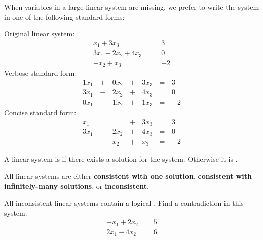 \begin{applicationActivities}
\begin{remark}
  When variables in a large linear system are missing, we prefer to
  write the system in one of the following standard forms:

  \begin{multicols}{3}\noindent
    Original linear system:
    \begin{alignat*}{2}
       x_1 + 3x_3 &\,=\,& 3 \\
      3x_1 - 2x_2 + 4x_3 &\,=\,& 0 \\
      -x_2 +  x_3 &\,=\,& -2
    \end{alignat*}
    Verbose standard form:
    \begin{alignat*}{4}
      1x_1 &\,+\,& 0x_2 &\,+\,& 3x_3 &\,=\,& 3 \\
      3x_1 &\,-\,& 2x_2 &\,+\,& 4x_3 &\,=\,& 0 \\
      0x_1 &\,-\,& 1x_2 &\,+\,& 1x_3 &\,=\,& -2
    \end{alignat*}
    Concise standard form:
    \begin{alignat*}{4}
       x_1 &     &      &\,+\,& 3x_3 &\,=\,& 3 \\
      3x_1 &\,-\,& 2x_2 &\,+\,& 4x_3 &\,=\,& 0 \\
           &\,-\,&  x_2 &\,+\,&  x_3 &\,=\,& -2
    \end{alignat*}
  \end{multicols}
\end{remark}

\begin{definition}
  A linear system is  if there exists a solution for the
  system. Otherwise it is .
\end{definition}

\begin{fact}
  All linear systems are either \textbf{consistent with one solution},
  \textbf{consistent with infinitely-many solutions}, or
  \textbf{inconsistent}.
\end{fact}

\begin{activity}{10}
  All inconsistent linear systems contain a logical .
  Find a contradiction in this system.
  \begin{align*}
  -x_1+2x_2  &=  5 \\
  2x_1-4x_2  &=  6
  \end{align*}
\end{activity}


\end{applicationActivities}
